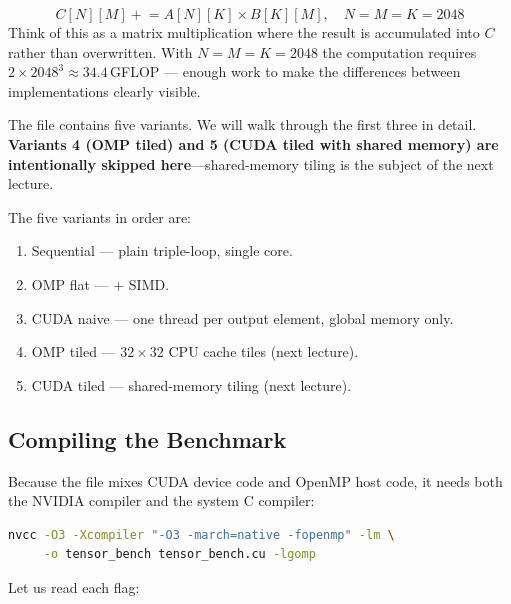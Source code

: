 \[
  C[N][M] \mathrel{+}= A[N][K] \times B[K][M], \quad N = M = K = 2048
\]
Think of this as a matrix multiplication where the result is accumulated into
$C$ rather than overwritten. With $N = M = K = 2048$ the computation requires
$2 \times 2048^3 \approx 34.4$\,GFLOP --- enough work to make the differences
between implementations clearly visible.
 
The file contains five variants. We will walk through the first three in
detail. \textbf{Variants 4 (OMP tiled) and 5 (CUDA tiled with shared memory)
are intentionally skipped here}---shared-memory tiling is the subject of the
next lecture.
 
\begin{ppnote}
The five variants in order are:
\begin{enumerate}
  \item Sequential --- plain triple-loop, single core.
  \item OMP flat ---  + SIMD.
  \item CUDA naive --- one thread per output element, global memory only.
  \item OMP tiled --- $32{\times}32$ CPU cache tiles (next lecture).
  \item CUDA tiled --- shared-memory tiling (next lecture).
\end{enumerate}
\end{ppnote}


\subsection{Compiling the Benchmark}
\label{ssec:compile}
 
Because the file mixes CUDA device code and OpenMP host code, it needs both
the NVIDIA compiler and the system C compiler:
 
\begin{lstlisting}[language=bash]
nvcc -O3 -Xcompiler "-O3 -march=native -fopenmp" -lm \
     -o tensor_bench tensor_bench.cu -lgomp
\end{lstlisting}
 
Let us read each flag:
 
